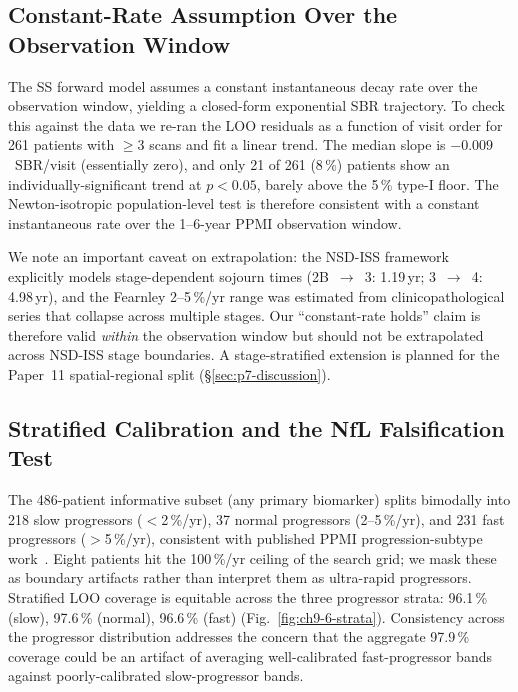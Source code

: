 \subsection{Constant-Rate Assumption Over the Observation Window}
\label{subsec:ch9-6-constant-rate}

The SS forward model assumes a constant instantaneous decay rate over the observation window, yielding a closed-form exponential SBR trajectory. To check this against the data we re-ran the LOO residuals as a function of visit order for 261 patients with $\geq$3 scans and fit a linear trend. The median slope is $-0.009$~SBR/visit (essentially zero), and only 21 of 261 (8\,\%) patients show an individually-significant trend at $p<0.05$, barely above the 5\,\% type-I floor. The Newton-isotropic population-level test is therefore consistent with a constant instantaneous rate over the 1--6-year PPMI observation window.

We note an important caveat on extrapolation: the NSD-ISS framework~\cite{simuni2024} explicitly models stage-dependent sojourn times (2B~$\to$~3: 1.19\,yr; 3~$\to$~4: 4.98\,yr), and the Fearnley 2--5\,\%/yr range was estimated from clinicopathological series that collapse across multiple stages. Our ``constant-rate holds'' claim is therefore valid \emph{within} the observation window but should not be extrapolated across NSD-ISS stage boundaries. A stage-stratified extension is planned for the Paper~11 spatial-regional split (\S\ref{sec:p7-discussion}).

\subsection{Stratified Calibration and the NfL Falsification Test}
\label{subsec:ch9-6-strata}

The 486-patient informative subset (any primary biomarker) splits bimodally into 218 slow progressors ($<$2\,\%/yr), 37 normal progressors (2--5\,\%/yr), and 231 fast progressors ($>$5\,\%/yr), consistent with published PPMI progression-subtype work~\cite{hahnel2024,chen2024jneurol}. Eight patients hit the 100\,\%/yr ceiling of the search grid; we mask these as boundary artifacts rather than interpret them as ultra-rapid progressors. Stratified LOO coverage is equitable across the three progressor strata: 96.1\,\% (slow), 97.6\,\% (normal), 96.6\,\% (fast) (Fig.~\ref{fig:ch9-6-strata}). Consistency across the progressor distribution addresses the concern that the aggregate 97.9\,\% coverage could be an artifact of averaging well-calibrated fast-progressor bands against poorly-calibrated slow-progressor bands.


